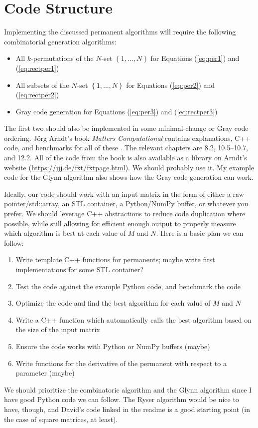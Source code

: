 \documentclass{article}
\begin{document}
\section*{Code Structure}

Implementing the discussed permanent algorithms will require the following combinatorial generation
algorithms:
\begin{itemize}
    \item All $k$-permutations of the $N$-set $\left\{1,\dots,N\right\}$
          for Equations (\ref{eq:per1}) and (\ref{eq:rectper1})
    \item All subsets of the $N$-set $\left\{1,\dots,N\right\}$ for Equations (\ref{eq:per2}) and
          (\ref{eq:rectper2})
    \item Gray code generation for Equations (\ref{eq:per3}) and (\ref{eq:rectper3})
\end{itemize}
The first two should also be implemented in some minimal-change or Gray code ordering.  J\"{o}rg
Arndt's book \emph{Matters Computational} contains explanations, C++ code, and benchmarks for all of
these \cite{arndt2010}. The relevant chapters are 8.2, 10.5--10.7, and 12.2. All of the code from the book
is also available as a library on Arndt's website (\url{https://jjj.de/fxt/fxtpage.html}). We should
probably use it. My example code for the Glynn algorithm also shows how the Gray code generation can work.

Ideally, our code should work with an input matrix in the form of either a raw pointer/std::array,
an STL container, a Python/NumPy buffer, or whatever you prefer. We should leverage C++ abstractions
to reduce code duplication where possible, while still allowing for efficient enough output to
properly measure which algorithm is best at each value of $M$ and $N$. Here is a basic plan we can
follow:
\begin{enumerate}
    \item Write template C++ functions for permanents; maybe write first implementations for some
          STL container?
    \item Test the code against the example Python code, and benchmark the code
    \item Optimize the code and find the best algorithm for each value of $M$ and $N$
    \item Write a C++ function which automatically calls the best algorithm based on the size of the
          input matrix
    \item Ensure the code works with Python or NumPy buffers (maybe)
    \item Write functions for the derivative of the permanent with respect to a parameter (maybe)
\end{enumerate}
We should prioritize the combinatoric algorithm and the Glynn algorithm since I have good Python
code we can follow. The Ryser algorithm would be nice to have, though, and David's code linked in the readme
is a good starting point (in the case of square matrices, at least).

\pagebreak



\end{document}

